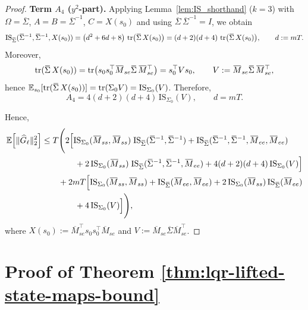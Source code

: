 \begin{proof}
\noindent\textbf{Term $A_4$ ($y^2$-part).}
Applying Lemma~\ref{lem:IS_shorthand} ($k=3$) with $\Omega=\overline\Sigma$, $A=B=\overline\Sigma^{-1}$, $C=X(s_0)$ and using
$\overline\Sigma\,\overline\Sigma^{-1}=I$, we obtain
\[
\mathrm{IS}_{\overline\Sigma}(\overline\Sigma^{-1},\overline\Sigma^{-1},X(s_0))
=\big(d^2+6d+8\big)\,\tr\!\big(\overline\Sigma\,X(s_0)\big)
=(d+2)(d+4)\,\tr\!\big(\overline\Sigma\,X(s_0)\big),
\qquad d:=mT.
\]
Moreover,
\[
\tr(\overline\Sigma\,X(s_0))
=\tr\!\big(s_0 s_0^\top \overline M_{se}\overline\Sigma\,\overline M_{se}^\top\big)
=s_0^\top V s_0,
\qquad
V:=\overline M_{se}\overline\Sigma\,\overline M_{se}^\top,
\]
hence $\E_{s_0}[\tr(\overline\Sigma\,X(s_0))]=\tr(\Sigma_0 V)=\mathrm{IS}_{\Sigma_0}(V)$.
Therefore,
\[
A_4
=4(d+2)(d+4)\,\mathrm{IS}_{\Sigma_0}(V),
\qquad d=mT.
\]

Hence,
\begin{equation}\label{eq:Ell-final}
\begin{aligned}
\E\!\left[\|\widehat G_\ell\|_2^2\right]
&\le
T\Bigg(
2\Big[
\mathrm{IS}_{\Sigma_0}(\overline M_{ss},\overline M_{ss})\;\mathrm{IS}_{\overline\Sigma}(\overline\Sigma^{-1},\overline\Sigma^{-1})
+\mathrm{IS}_{\overline\Sigma}(\overline\Sigma^{-1},\overline\Sigma^{-1},\overline M_{ee},\overline M_{ee})\\
&\qquad\qquad
+2\,\mathrm{IS}_{\Sigma_0}(\overline M_{ss})\;\mathrm{IS}_{\overline\Sigma}(\overline\Sigma^{-1},\overline\Sigma^{-1},\overline M_{ee})
+4(d+2)(d+4)\,\mathrm{IS}_{\Sigma_0}(V)
\Big]\\
&\qquad
+2mT\Big[
\mathrm{IS}_{\Sigma_0}(\overline M_{ss},\overline M_{ss})
+\mathrm{IS}_{\overline\Sigma}(\overline M_{ee},\overline M_{ee})
+2\,\mathrm{IS}_{\Sigma_0}(\overline M_{ss})\,\mathrm{IS}_{\overline\Sigma}(\overline M_{ee})\\
&\qquad\qquad
+4\,\mathrm{IS}_{\Sigma_0}(V)
\Big]
\Bigg),
\end{aligned}
\end{equation}
where $X(s_0):=\overline M_{se}^\top s_0 s_0^\top \overline M_{se}$ and $V:=\overline M_{se}\overline\Sigma \overline M_{se}^\top$.

\end{proof}


\section{Proof of Theorem \ref{thm:lqr-lifted-state-maps-bound}}
\label{sec:app-proof-lqr-lifted-state-maps-bound}

